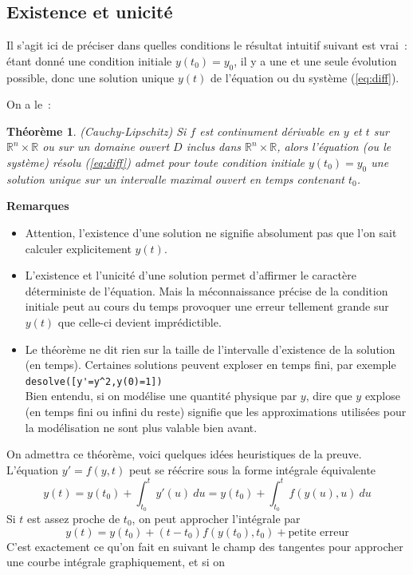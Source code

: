 \documentclass[a4paper,11pt]{article}
\newtheorem{thm}{Théorème}
\newcommand{\R}{{\mathbb{R}}}
\begin{document}
\begin{giacjshere}
\subsection{Existence et unicit\'e} \label{sec:existence}
Il s'agit ici de pr\'eciser dans quelles conditions le r\'esultat
intuitif suivant est vrai~: \'etant donn\'e une condition initiale
$y(t_0)=y_0$, il y a une et une seule \'evolution possible, donc
une solution unique $y(t)$ de l'\'equation ou du syst\`eme
(\ref{eq:diff}).

On a le~:
\begin{thm} \label{thm:eqdiff} (Cauchy-Lipschitz)
Si $f$ est continument d\'erivable en $y$ et $t$ sur $\R^n \times \R$
ou sur un domaine ouvert $D$ inclus dans $\R^n \times \R$, alors l'\'equation
(ou le syst\`eme) r\'esolu (\ref{eq:diff}) admet pour toute condition
initiale $y(t_0)=y_0$ une solution unique
sur un intervalle maximal ouvert en temps contenant $t_0$.
\end{thm}
{\bf Remarques}
\begin{itemize}
\item
Attention, l'existence d'une solution ne signifie absolument pas que
l'on sait calculer explicitement $y(t)$.
\item
L'existence et l'unicit\'e d'une solution permet d'affirmer le
caract\`ere d\'eterministe de l'\'equation. Mais la m\'econnaissance
pr\'ecise de la condition initiale peut au cours du temps
provoquer une erreur tellement grande sur $y(t)$
que celle-ci devient impr\'edictible.
\item Le th\'eor\`eme ne dit rien sur la taille de l'intervalle
d'existence de la solution (en temps). Certaines solutions
peuvent exploser en temps fini, par exemple\\
\verb|desolve([y'=y^2,y(0)=1])|\\
Bien entendu, si on mod\'elise une quantit\'e physique par $y$, dire
que $y$ explose (en temps fini ou infini du reste)
signifie que les approximations utilis\'ees pour la mod\'elisation
ne sont plus valable bien avant.
\end{itemize}
On admettra ce th\'eor\`eme, voici quelques id\'ees heuristiques
de la preuve. L'\'equation $y'=f(y,t)$ peut se r\'e\'ecrire sous la forme
int\'egrale \'equivalente 
$$y(t)=y(t_0)+\int_{t_0}^t y'(u) \ du =
 y(t_0)+\int_{t_0}^t f(y(u),u)\ du $$ 
Si $t$ est assez proche de $t_0$, on peut approcher l'int\'egrale par 
$$ y(t) = y(t_0) + (t-t_0) f(y(t_0),t_0) + \mbox{petite erreur}$$
C'est exactement ce qu'on fait en suivant le champ des tangentes
pour approcher une courbe int\'egrale graphiquement, et si on

\end{giacjshere}
\end{document}
